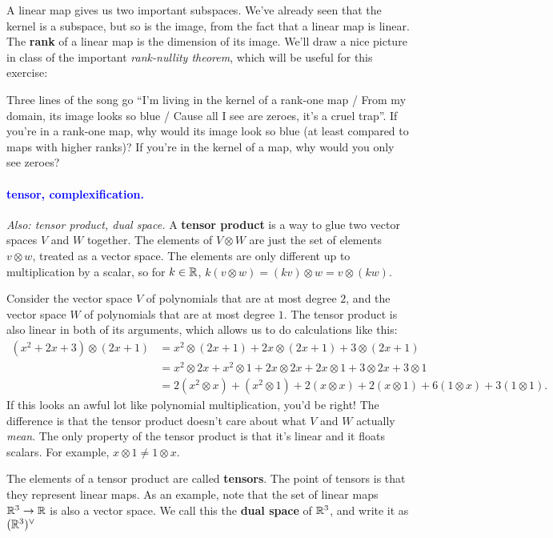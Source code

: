 \documentclass[11pt,paper=letter]{scrartcl}
\renewcommand{\bluebf}[1]{{\bfseries \color{Blue} #1}}
\renewcommand\wp[1]{\paragraph{\textcolor{Blue}{#1.}} \hspace{-1em}}
\newcommand\wl[1]{\label{w:#1}}
\newcommand\oww[1]{\textit{Also: #1.}}
\begin{document}
A linear map gives us two important subspaces. We've already seen that the kernel is a subspace, but so is the image, from the fact that a linear map is linear. The \textbf{rank} of a linear map is the dimension of its image. We'll draw a nice picture in class of the important \textit{rank-nullity theorem}, which will be useful for this exercise:

\begin{exrboxed}
  Three lines of the song go ``I'm living in the kernel of a rank-one map / From my domain, its image looks so blue / Cause all I see are zeroes, it's a cruel trap''. If you're in a rank-one map, why would its image look so blue (at least compared to maps with higher ranks)? If you're in the kernel of a map, why would you only see zeroes?
\end{exrboxed}

\wp{tensor, complexification}
\wl{tensor}
\wl{complexification}
\oww{tensor product, dual space}
A \textbf{tensor product} is a way to glue two vector spaces $V$ and $W$ together. The elements of $V \otimes W$ are just the set of elements $v \otimes w$, treated as a vector space. The elements are only different up to multiplication by a scalar, so for $k \in \mathbb R$, $k(v \otimes w) = (kv) \otimes w = v \otimes (kw)$.

Consider the vector space $V$ of polynomials that are at most degree $2$, and the vector space $W$ of polynomials that are at most degree $1$. The tensor product is also linear in both of its arguments, which allows us to do calculations like this:
\begin{align*}
  (x^2 + 2x + 3) \otimes (2x + 1)
  &= x^2 \otimes (2x + 1) + 2x \otimes (2x + 1) + 3 \otimes (2x + 1) \\
  &= x^2 \otimes 2x + x^2 \otimes 1 + 2x \otimes 2x + 2x \otimes 1 + 3 \otimes 2x + 3 \otimes 1 \\
  &= 2(x^2 \otimes x) + (x^2 \otimes 1) + 2(x \otimes x) + 2(x \otimes 1) + 6(1 \otimes x) + 3(1 \otimes 1).
\end{align*}
If this looks an awful lot like polynomial multiplication, you'd be right! The difference is that the tensor product doesn't care about what $V$ and $W$ actually \textit{mean}. The only property of the tensor product is that it's linear and it floats scalars. For example, $x \otimes 1 \ne 1 \otimes x$.

The elements of a tensor product are called \bluebf{tensors}. The point of tensors is that they represent linear maps. As an example, note that the set of linear maps $\mathbb R^3 \to \mathbb R$ is also a vector space. We call this the \textbf{dual space} of $\mathbb R^3$, and write it as $(\mathbb R^3)^{\vee}$
\end{document}
